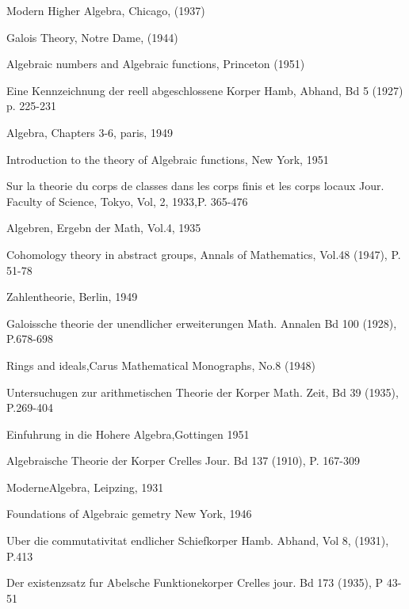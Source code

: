 \begin{thebibliography}{99}
\pageoriginale Modern Higher Algebra,
  Chicago, (1937)  

 Galois Theory, Notre Dame, (1944)

 Algebraic numbers and Algebraic functions,
  Princeton (1951)

  Eine Kennzeichnung der reell
  abgeschlossene Korper Hamb, Abhand, Bd 5 (1927) p. 225-231 

 Algebra, Chapters 3-6, paris, 1949

 Introduction to the theory of Algebraic
  functions, New York, 1951 

 Sur la theorie du corps de classes dans les
  corps finis et les corps locaux Jour. Faculty of Science, Tokyo,
  Vol, 2, 1933,P. 365-476  

 Algebren, Ergebn der Math, Vol.4, 1935

 Cohomology theory in abstract
  groups, Annals of Mathematics, Vol.48 (1947), P. 51-78  

 Zahlentheorie, Berlin, 1949

 Galoissche theorie der unendlicher
  erweiterungen Math. Annalen Bd 100 (1928), P.678-698  

 Rings and ideals,Carus Mathematical
  Monographs, No.8 (1948) 

\pageoriginale Untersuchugen zur
  arithmetischen  Theorie   der Korper Math. Zeit, Bd 39 (1935),
  P.269-404  

 Einfuhrung in die Hohere Algebra,Gottingen
  1951  

 Algebraische Theorie der Korper Crelles
  Jour. Bd 137 (1910), P. 167-309 

 ModerneAlgebra, Leipzing, 1931

 Foundations of Algebraic gemetry New York, 1946

 Uber die commutativitat endlicher Schiefkorper
  Hamb. Abhand, Vol 8, (1931), P.413 

 Der existenzsatz fur Abelsche Funktionekorper
  Crelles jour. Bd 173 (1935), P 43-51 
\end{thebibliography}


